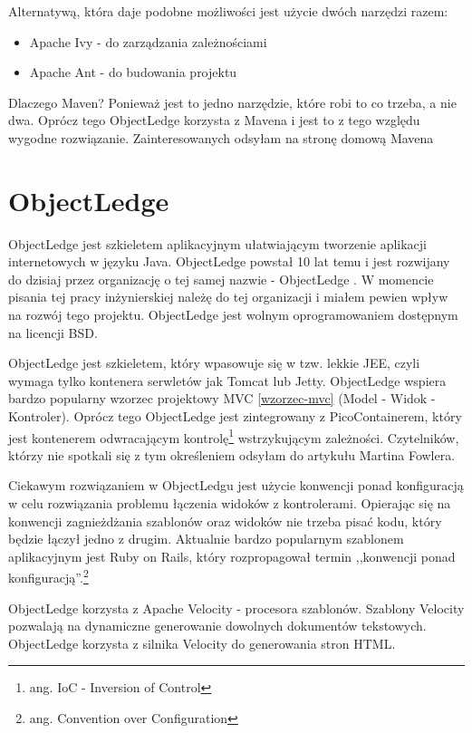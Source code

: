 \documentclass[a4paper,onecolumn,oneside,11pt,wide,floatssmall]{mwrep}
\theoremstyle{definition}
\theoremstyle{plain}%
\theoremstyle{remark}
\begin{document}
Alternatywą, która daje podobne możliwości jest użycie dwóch narzędzi razem:
\begin{itemize}
  \item Apache Ivy - do zarządzania zależnościami
  \item Apache Ant - do budowania projektu
\end{itemize}

Dlaczego Maven? Ponieważ jest to jedno narzędzie, które robi to co trzeba, a nie dwa. Oprócz tego ObjectLedge korzysta z Mavena i jest to z tego względu wygodne rozwiązanie. Zainteresowanych odsyłam na stronę domową Mavena \cite{mavenHome}

\section{ObjectLedge}
ObjectLedge jest szkieletem aplikacyjnym ułatwiającym tworzenie aplikacji internetowych w języku Java. ObjectLedge powstał 10 lat temu i jest rozwijany do dzisiaj przez organizację o tej samej nazwie - ObjectLedge \cite{objectLedgeOrgHome}. W momencie pisania tej pracy inżynierskiej należę do tej organizacji i miałem pewien wpływ na rozwój tego projektu. ObjectLedge jest wolnym oprogramowaniem dostępnym na licencji BSD.

ObjectLedge jest szkieletem, który wpasowuje się w tzw. lekkie JEE, czyli wymaga tylko kontenera serwletów jak Tomcat lub Jetty. ObjectLedge wspiera bardzo popularny wzorzec projektowy MVC \ref{wzorzec-mvc} (Model - Widok - Kontroler). Oprócz tego ObjectLedge jest zintegrowany z PicoContainerem, który jest kontenerem odwracającym kontrolę\footnote{ang. IoC - Inversion of Control} wstrzykującym zależności. Czytelników, którzy nie spotkali się z tym określeniem odsyłam do artykułu Martina Fowlera. \cite{fowlerDIIOC} 

Ciekawym rozwiązaniem w ObjectLedgu jest użycie konwencji ponad konfiguracją w celu rozwiązania problemu łączenia widoków z kontrolerami. Opierając się na konwencji zagnieżdżania szablonów oraz widoków nie trzeba pisać kodu, który będzie łączył jedno z drugim. Aktualnie bardzo popularnym szablonem aplikacyjnym jest Ruby on Rails\cite{rubyOnRailsHome}, który rozpropagował termin ,,konwencji ponad konfiguracją''.\footnote{ang. Convention over Configuration}

ObjectLedge korzysta z Apache Velocity\cite{velocityHome} - procesora szablonów. Szablony Velocity pozwalają na dynamiczne generowanie dowolnych dokumentów tekstowych. ObjectLedge korzysta z silnika Velocity do generowania stron HTML.
\end{document}
